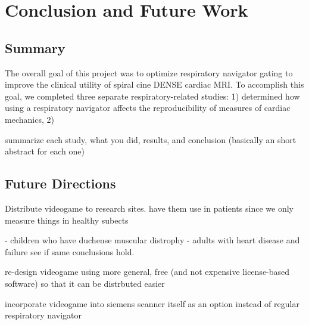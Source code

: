 \chapter{Conclusion and Future Work}

\section{Summary}
	The overall goal of this project was to optimize respiratory navigator gating to improve the clinical utility of spiral cine DENSE cardiac MRI. To accomplish this goal, we completed three separate respiratory-related studies: 1) determined how using a respiratory navigator affects the reproducibility of measures of cardiac mechanics, 2)
	
	summarize each study, what you did, results, and conclusion (basically an short abstract for each one)
	
\section{Future Directions}
	Distribute videogame to research sites. have them use in patients since we only measure things in healthy subects
	
	- children who have duchense muscular distrophy
	- adults with heart disease and failure
	see if same conclusions hold.
	
	re-design videogame using more general, free (and not expensive license-based software) so that it can be distrbuted easier
	
	incorporate videogame into siemens scanner itself as an option instead of regular respiratory navigator
	
	